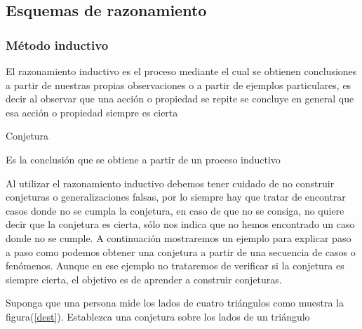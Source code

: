 \subsection{\label{sub:Esquemas-de-razonamiento}Esquemas de razonamiento}


\subsubsection{Método inductivo}

El razonamiento inductivo es el proceso mediante el cual se obtienen
conclusiones a partir de nuestras propias observaciones o a partir
de ejemplos particulares, es decir al observar que una acción o propiedad
se repite se concluye en general que esa acción o propiedad siempre
es cierta 

\begin{ideas}{Conjetura}

Es la conclusión que se obtiene a partir de un proceso inductivo 

\end{ideas}

\nota Al utilizar el razonamiento inductivo debemos tener cuidado
de no construir conjeturas o generalizaciones falsas, por lo siempre
hay que tratar de encontrar casos donde no se cumpla la conjetura,
en caso de que no se consiga, no quiere decir que la conjetura es
cierta, sólo nos indica que no hemos encontrado un caso donde no se
cumple. A continuación mostraremos un ejemplo para explicar paso a
paso como podemos obtener una conjetura a partir de una secuencia
de casos o fenómenos. Aunque en ese ejemplo no trataremos de verificar
si la conjetura es siempre cierta, el objetivo es de aprender a construir
conjeturas. 

\begin{ejem}{} Suponga que una persona mide los lados de cuatro triángulos
como muestra la figura(\ref{dest}). Establezca una conjetura sobre
los lados de un triángulo

\end{ejem}

